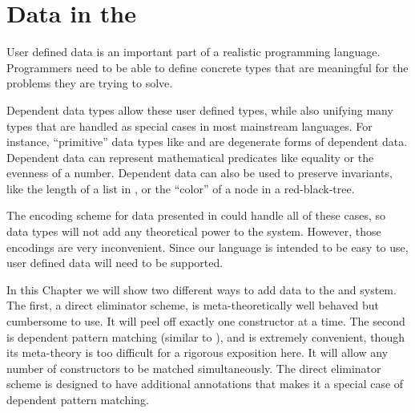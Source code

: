 \chapter{Data in the \SLang{}}
\label{chapter:SurfaceData}
\thispagestyle{myheadings}

User defined data is an important part of a realistic programming language.
Programmers need to be able to define concrete types that are meaningful for the problems they are trying to solve.

Dependent data types allow these user defined types, while also unifying many types that are handled as special cases in most mainstream languages.
For instance, ``primitive'' data types like \Nat{} and \Bool{} are degenerate forms of dependent data.
Dependent data can represent mathematical predicates like equality or the evenness of a number.
Dependent data can also be used to preserve invariants, like the length of a list in \Vect{}, or the ``color'' of a node in a red-black-tree.

The encoding scheme for data presented in  could handle all of these cases, so data types will not add any theoretical power to the system.
However, those encodings are very inconvenient. 
Since our language is intended to be easy to use, user defined data will need to be supported.

In this Chapter we will show two different ways to add data to the \slang{} and \bidir{} system.
The first, a direct eliminator scheme, is meta-theoretically well behaved but cumbersome to use.
It will peel off exactly one constructor at a time.
The second is dependent pattern matching (similar to \cite{coquand1992pattern}), and is extremely convenient, though its meta-theory is too difficult for a rigorous exposition here.
It will allow any number of constructors to be matched simultaneously.
The direct eliminator scheme is designed to have additional annotations that makes it a special case of dependent pattern matching.
 

